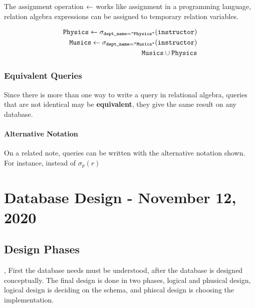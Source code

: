 \documentclass[11pt,a4paper,twocolumn]{book}
\begin{document}
The assignment operation $\leftarrow$ works like assignment in a programming language, relation algebra expressions can be assigned to temporary relation variables.

\begin{align*}
\texttt{Physics} \leftarrow \sigma_{\texttt{dept\_name} = \texttt{"Physics"}}(\texttt{instructor})\\
\texttt{Musics} \leftarrow \sigma_{\texttt{dept\_name} = \texttt{"Musics"}}(\texttt{instructor})\\
\texttt{Musics} \cup \texttt{Physics}
\end{align*}

\subsection{Equivalent Queries}

Since there is more than one way to write a query in relational algebra, queries that are not identical may be \textbf{equivalent}, they give the same result on any database.

\subsubsection{Alternative Notation}

On a related note, queries can be written with the alternative notation shown. For instance,  instead of $\sigma_p (r)$

\chapter{Database Design - November 12, 2020}

\section{Design Phases}

\missing, First the database needs must be understood, after the database is designed conceptually. The final design is done in two phases, logical and phusical design, logical design is deciding on the schema, and phiscal design is choosing the implementation.
\end{document}

